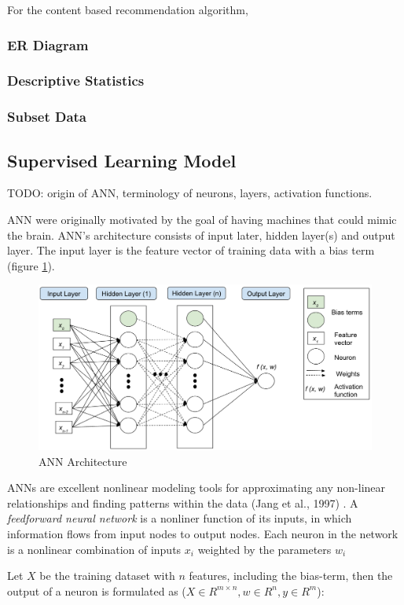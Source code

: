 \documentclass[12pt]{article}
\begin{document}
For the content based recommendation algorithm, 


\subsubsection{ER Diagram}
\subsubsection{Descriptive Statistics}
\subsubsection{Subset Data}

\subsection{Supervised Learning Model}
TODO: origin of ANN, terminology of neurons, layers, activation functions.

ANN were originally motivated by the goal of having machines that could mimic the brain. ANN's architecture consists of input later, hidden layer(s) and output layer. The input layer is the feature vector of training data with a bias term (figure \ref{fig:figure_ann_architecture}).
\begin{figure}[h]
	\centering
	\includegraphics[width=0.7\linewidth]{figure_ann_architecture}
	\caption[ANN Architecture]{ANN Architecture}
	\label{fig:figure_ann_architecture}
\end{figure}

ANNs are excellent nonlinear modeling tools for approximating any non-linear relationships and finding patterns within the data (Jang et al., 1997) \cite{jang}. A \textit{feedforward neural network} is a nonliner function of its inputs, in which information flows from input nodes to output nodes. Each neuron in the network is a nonlinear combination of inputs $x_i$ weighted by the parameters $w_i$

Let $X$ be the training dataset with $n$ features, including the bias-term, then the output of a neuron is formulated as ($X \in R^{m \times n}, w \in R^{n}, y \in R ^{m}$):
\end{document}
